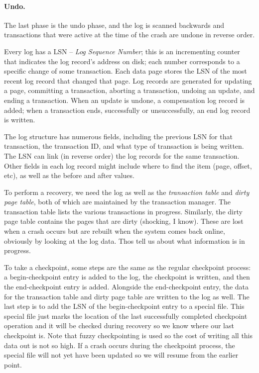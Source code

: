 \paragraph{Undo.} The last phase is the undo phase, and the log is scanned backwards and transactions that were active at the time of the crash are undone in reverse order. 

Every log has a LSN -- \textit{Log Sequence Number}; this is an incrementing counter that indicates the log record's address on disk; each number corresponds to a specific change of some transaction. Each data page stores the LSN of the most recent log record that changed that page. Log records are generated for updating a page, committing a transaction, aborting a transaction, undoing an update, and ending a transaction.  When an update is undone, a compensation log record is added; when a transaction ends, successfully or unsuccessfully, an end log record is written. 

The log structure has numerous fields, including the previous LSN for that transaction, the transaction ID, and what type of transaction is being written. The LSN can link (in reverse order) the log records for the same transaction. Other fields in each log record might include where to find the item (page, offset, etc), as well as the before and after values.

To perform a recovery, we need the log as well as the \textit{transaction table} and \textit{dirty page table}, both of which are maintained by the transaction manager. The transaction table lists the various transactions in progress. Similarly, the dirty page table contains the pages that are dirty (shocking, I know). These are lost when a crash occurs but are rebuilt when the system comes back online, obviously by looking at the log data. Thos tell us about what information is in progress.

To take a checkpoint, some steps are the same as the regular checkpoint process: a begin-checkpoint entry is added to the log, the checkpoint is written, and then the end-checkpoint entry is added. Alongside the end-checkpoint entry, the data for the transaction table and dirty page table are written to the log as well. The last step is to add the LSN of the begin-checkpoint entry to a special file. This special file just marks the location of the last successfully completed checkpoint operation and it will be checked during recovery so we know where our last checkpoint is. Note that fuzzy checkpointing is used so the cost of writing all this data out is not so high. If a crash occurs during the checkpoint process, the special file will not yet have been updated so we will resume from the earlier point.

